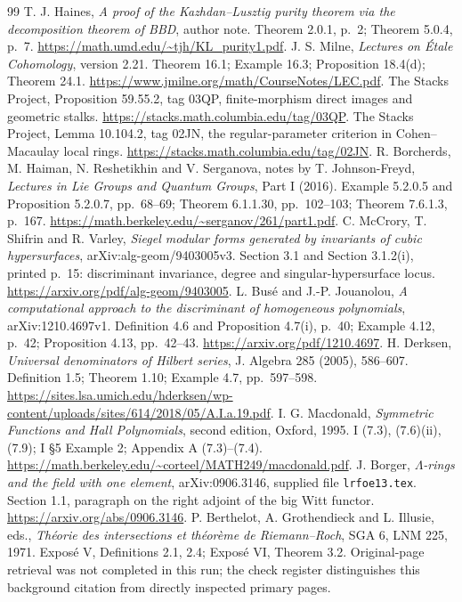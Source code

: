 \documentclass[11pt,a4paper]{article}
\begin{document}
\begin{thebibliography}{99}
 T. J. Haines, \emph{A proof of the Kazhdan--Lusztig purity theorem via the decomposition theorem of BBD}, author note. Theorem 2.0.1, p.~2; Theorem 5.0.4, p.~7. \url{https://math.umd.edu/~tjh/KL_purity1.pdf}.
 J. S. Milne, \emph{Lectures on \'Etale Cohomology}, version 2.21. Theorem 16.1; Example 16.3; Proposition 18.4(d); Theorem 24.1. \url{https://www.jmilne.org/math/CourseNotes/LEC.pdf}.
 The Stacks Project, Proposition 59.55.2, tag 03QP, finite-morphism direct images and geometric stalks. \url{https://stacks.math.columbia.edu/tag/03QP}.
 The Stacks Project, Lemma 10.104.2, tag 02JN, the regular-parameter criterion in Cohen--Macaulay local rings. \url{https://stacks.math.columbia.edu/tag/02JN}.
 R. Borcherds, M. Haiman, N. Reshetikhin and V. Serganova, notes by T. Johnson-Freyd, \emph{Lectures in Lie Groups and Quantum Groups}, Part I (2016). Example 5.2.0.5 and Proposition 5.2.0.7, pp.~68--69; Theorem 6.1.1.30, pp.~102--103; Theorem 7.6.1.3, p.~167. \url{https://math.berkeley.edu/~serganov/261/part1.pdf}.
 C. McCrory, T. Shifrin and R. Varley, \emph{Siegel modular forms generated by invariants of cubic hypersurfaces}, arXiv:alg-geom/9403005v3. Section 3.1 and Section 3.1.2(i), printed p.~15: discriminant invariance, degree and singular-hypersurface locus. \url{https://arxiv.org/pdf/alg-geom/9403005}.
 L. Bus\'e and J.-P. Jouanolou, \emph{A computational approach to the discriminant of homogeneous polynomials}, arXiv:1210.4697v1. Definition 4.6 and Proposition 4.7(i), p.~40; Example 4.12, p.~42; Proposition 4.13, pp.~42--43. \url{https://arxiv.org/pdf/1210.4697}.
 H. Derksen, \emph{Universal denominators of Hilbert series}, J. Algebra 285 (2005), 586--607. Definition 1.5; Theorem 1.10; Example 4.7, pp.~597--598. \url{https://sites.lsa.umich.edu/hderksen/wp-content/uploads/sites/614/2018/05/A.I.a.19.pdf}.
 I. G. Macdonald, \emph{Symmetric Functions and Hall Polynomials}, second edition, Oxford, 1995. I (7.3), (7.6)(ii), (7.9); I \S5 Example 2; Appendix A (7.3)--(7.4). \url{https://math.berkeley.edu/~corteel/MATH249/macdonald.pdf}.
 J. Borger, \emph{$\Lambda$-rings and the field with one element}, arXiv:0906.3146, supplied file \texttt{lrfoe13.tex}. Section 1.1, paragraph on the right adjoint of the big Witt functor. \url{https://arxiv.org/abs/0906.3146}.
 P. Berthelot, A. Grothendieck and L. Illusie, eds., \emph{Th\'eorie des intersections et th\'eor\`eme de Riemann--Roch}, SGA 6, LNM 225, 1971. Expos\'e V, Definitions 2.1, 2.4; Expos\'e VI, Theorem 3.2. Original-page retrieval was not completed in this run; the check register distinguishes this background citation from directly inspected primary pages.

\end{thebibliography}
\end{document}

